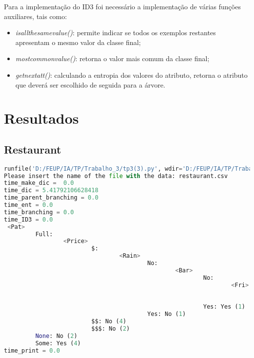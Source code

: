 \documentclass{article}
\begin{document}
Para a implementação do ID3 foi necessário a implementação de várias funções auxiliares, tais como:
\begin{itemize}
    \item{\textit{is\textunderscore all\textunderscore the\textunderscore same\textunderscore value()}:} permite indicar se todos os exemplos restantes apresentam o mesmo valor da classe final;
    \item{\textit{most\textunderscore common\textunderscore value()}:} retorna o valor mais comum da classe final;
    \item{\textit{get\textunderscore next\textunderscore att()}:} calculando a entropia dos valores do atributo, retorna o atributo que deverá ser escolhido de seguida para a árvore.
\end{itemize}
\section{Resultados}
\subsection{Restaurant}
\begin{lstlisting}[language = Python]
runfile('D:/FEUP/IA/TP/Trabalho_3/tp3(3).py', wdir='D:/FEUP/IA/TP/Trabalho_3')
Please insert the name of the file with the data: restaurant.csv
time_make_dic =  0.0
time_dic = 5.41792106628418
time_parent_branching = 0.0
time_ent = 0.0
time_branching = 0.0
time_ID3 = 0.0
 <Pat>
         Full:
                 <Price>
                         $:
                                 <Rain>
                                         No:
                                                 <Bar>
                                                         No:
                                                                 <Fri>
                                                                         No: No (1)
                                                                         Yes: Yes (1)
                                                         Yes: Yes (1)
                                         Yes: No (1)
                         $$: No (4)
                         $$$: No (2)
         None: No (2)
         Some: Yes (4)
time_print = 0.0
\end{lstlisting}
\end{document}
